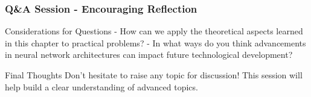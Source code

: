 \documentclass[aspectratio=169]{beamer}
\begin{document}
\begin{frame}[fragile]
    \frametitle{Q\&A Session - Encouraging Reflection}
    \begin{block}{Considerations for Questions}
    - How can we apply the theoretical aspects learned in this chapter to practical problems?
    - In what ways do you think advancements in neural network architectures can impact future technological development?
    \end{block}
    
    \begin{block}{Final Thoughts}
    Don't hesitate to raise any topic for discussion! This session will help build a clear understanding of advanced topics.
    \end{block}
\end{frame}
\end{document}

